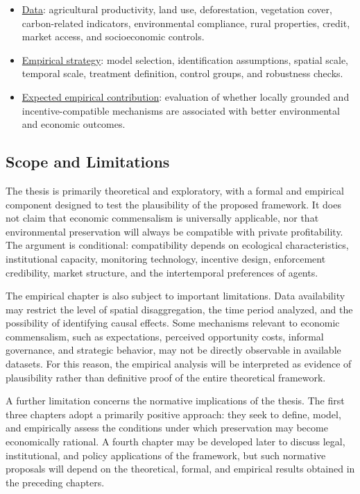 \begin{itemize}
\begin{itemize}
        \item[iii.] \underline{Data}: agricultural productivity, land use, deforestation, vegetation cover, carbon-related indicators, environmental compliance, rural properties, credit, market access, and socioeconomic controls.

        \item[iv.] \underline{Empirical strategy}: model selection, identification assumptions, spatial scale, temporal scale, treatment definition, control groups, and robustness checks.

        \item[v.] \underline{Expected empirical contribution}: evaluation of whether locally grounded and incentive-compatible mechanisms are associated with better environmental and economic outcomes.

    \end{itemize}

\end{itemize}

\subsection{Scope and Limitations}

The thesis is primarily theoretical and exploratory, with a formal and empirical component designed to test the plausibility of the proposed framework. It does not claim that economic commensalism is universally applicable, nor that environmental preservation will always be compatible with private profitability. The argument is conditional: compatibility depends on ecological characteristics, institutional capacity, monitoring technology, incentive design, enforcement credibility, market structure, and the intertemporal preferences of agents.

The empirical chapter is also subject to important limitations. Data availability may restrict the level of spatial disaggregation, the time period analyzed, and the possibility of identifying causal effects. Some mechanisms relevant to economic commensalism, such as expectations, perceived opportunity costs, informal governance, and strategic behavior, may not be directly observable in available datasets. For this reason, the empirical analysis will be interpreted as evidence of plausibility rather than definitive proof of the entire theoretical framework.

A further limitation concerns the normative implications of the thesis. The first three chapters adopt a primarily positive approach: they seek to define, model, and empirically assess the conditions under which preservation may become economically rational. A fourth chapter may be developed later to discuss legal, institutional, and policy applications of the framework, but such normative proposals will depend on the theoretical, formal, and empirical results obtained in the preceding chapters.

